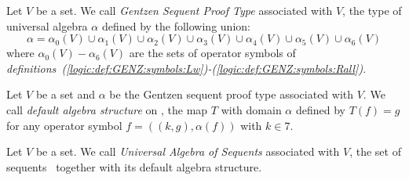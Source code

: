 \begin{defin}\label{logic:def:GENZ:UAsequents:type}
Let $V$ be a set. We call {\em Gentzen Sequent Proof Type}
associated with $V$, the type of universal algebra $\alpha$ defined
by the following union:
    \[
    \alpha = \alpha_{0}(V)\cup\alpha_{1}(V)\cup\alpha_{2}(V)\cup\alpha_{3}(V)\cup\alpha_{4}(V)
    \cup\alpha_{5}(V)\cup\alpha_{6}(V)
    \]
where $\alpha_{0}(V)-\alpha_{6}(V)$ are the sets of operator symbols
of {\em
definitions~(\ref{logic:def:GENZ:symbols:Lw})-(\ref{logic:def:GENZ:symbols:Rall})}.
\end{defin}

\begin{defin}\label{logic:def:GENZ:UAsequents:structure}
Let $V$ be a set and $\alpha$ be the Gentzen sequent proof type
associated with $V$. We call {\em default algebra structure} on \sv,
the map $T$ with domain $\alpha$ defined by $T(f)=g$ for any
operator symbol $f=((k,g),\alpha(f))$ with $k\in 7$.
\end{defin}

\begin{defin}\label{logic:def:GENZ:UAsequents:UA}
Let $V$ be a set. We call {\em Universal Algebra of Sequents}
associated with $V$, the set of sequents \sv\ together with its
default algebra structure.
\end{defin}
